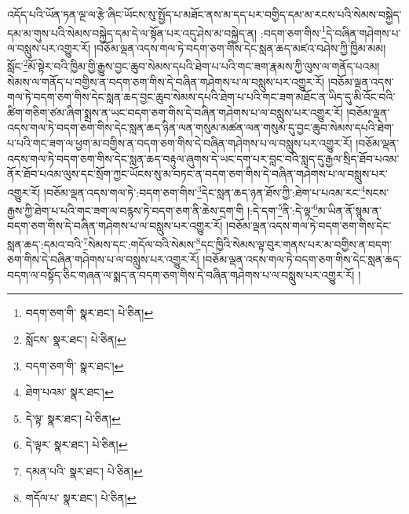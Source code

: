 འདོད་པའི་ཡོན་ཏན་ལྔ་ལ་རྩེ་ཞིང་ཡོངས་སུ་སྤྱོད་པ་མཐོང་ནས་མ་དད་པར་བགྱིད་དམ་མ་རངས་པའི་སེམས་བསྐྱེད་དམ་མ་གུས་པའི་སེམས་བསྐྱེད་དམ་དེ་ལ་སྟོན་པར་འདུ་ཤེས་མ་བསྐྱེད་ན། :བདག་ཅག་གིས་\footnote{བདག་ཅག་གི་  སྣར་ཐང་།  པེ་ཅིན། }དེ་བཞིན་གཤེགས་པ་ལ་བསླུས་པར་འགྱུར་རོ། །བཅོམ་ལྡན་འདས་གལ་ཏེ་བདག་ཅག་གིས་དེང་སླན་ཆད་མཛའ་བཤེས་ཀྱི་ཁྱིམ་མམ། སློང་\footnote{སློངས་  སྣར་ཐང་།  པེ་ཅིན། }མོ་སྟེར་བའི་ཁྱིམ་གྱི་རྒྱུས་བྱང་ཆུབ་སེམས་དཔའི་ཐེག་པ་པའི་གང་ཟག་རྣམས་ཀྱི་ལུས་ལ་གནོད་པའམ། སེམས་ལ་གནོད་པ་བགྱིས་ན་བདག་ཅག་གིས་དེ་བཞིན་གཤེགས་པ་ལ་བསླུས་པར་འགྱུར་རོ། །བཅོམ་ལྡན་འདས་གལ་ཏེ་བདག་ཅག་གིས་དེང་སླན་ཆད་བྱང་ཆུབ་སེམས་དཔའི་ཐེག་པ་པའི་གང་ཟག་མཐོང་ན་ཡིད་དུ་མི་འོང་བའི་ཚིག་གཅིག་ཙམ་ཞིག་སྨྲས་ན་ཡང་བདག་ཅག་གིས་དེ་བཞིན་གཤེགས་པ་ལ་བསླུས་པར་འགྱུར་རོ། །བཅོམ་ལྡན་འདས་གལ་ཏེ་བདག་ཅག་གིས་དེང་སླན་ཆད་ཉིན་ལན་གསུམ་མཚན་ལན་གསུམ་དུ་བྱང་ཆུབ་སེམས་དཔའི་ཐེག་པ་པའི་གང་ཟག་ལ་ཕྱག་མ་བགྱིས་ན་བདག་ཅག་གིས་དེ་བཞིན་གཤེགས་པ་ལ་བསླུས་པར་འགྱུར་རོ། །བཅོམ་ལྡན་འདས་གལ་ཏེ་བདག་ཅག་གིས་དེང་སླན་ཆད་བརྟུལ་ཞུགས་དེ་ཡང་དག་པར་བླང་བའི་སླད་དུ་རྒྱལ་སྲིད་ཐོབ་པའམ་ནོར་ཐོབ་པའམ་ལུས་དང་སྲོག་ཀྱང་ཡོངས་སུ་མ་བཏང་ན་བདག་ཅག་གིས་དེ་བཞིན་གཤེགས་པ་ལ་བསླུས་པར་འགྱུར་རོ། །བཅོམ་ལྡན་འདས་གལ་ཏེ་:བདག་ཅག་གིས་\footnote{བདག་ཅག་གི་  སྣར་ཐང་། }དེང་སླན་ཆད་ཉན་ཐོས་ཀྱི་:ཐེག་པ་པའམ་རང་\footnote{ཐེག་པའམ་  སྣར་ཐང་། }སངས་རྒྱས་ཀྱི་ཐེག་པ་པའི་གང་ཟག་ལ་བརྙས་ཏེ་བདག་ཅག་ནི་ཆེས་དྲག་གི །:དེ་དག་\footnote{དེ་ལྟ་  སྣར་ཐང་།  པེ་ཅིན། }ནི་:དེ་ལྟ་\footnote{དེ་ལྟར་  སྣར་ཐང་།  པེ་ཅིན། }མ་ཡིན་ནོ་སྙམ་ན་བདག་ཅག་གིས་དེ་བཞིན་གཤེགས་པ་ལ་བསླུས་པར་འགྱུར་རོ། །བཅོམ་ལྡན་འདས་གལ་ཏེ་བདག་ཅག་གིས་དེང་སླན་ཆད་:དམའ་བའི་\footnote{དམན་པའི་  སྣར་ཐང་།  པེ་ཅིན། }སེམས་དང་:གདོལ་བའི་སེམས་\footnote{གདོལ་པ་  སྣར་ཐང་།  པེ་ཅིན། }དང་ཁྱིའི་སེམས་ལྟ་བུར་གནས་པར་མ་བགྱིས་ན་བདག་ཅག་གིས་དེ་བཞིན་གཤེགས་པ་ལ་བསླུས་པར་འགྱུར་རོ། །བཅོམ་ལྡན་འདས་གལ་ཏེ་བདག་ཅག་གིས་དེང་སླན་ཆད་བདག་ལ་བསྟོད་ཅིང་གཞན་ལ་སྨད་ན་བདག་ཅག་གིས་དེ་བཞིན་གཤེགས་པ་ལ་བསླུས་པར་འགྱུར་རོ། །
